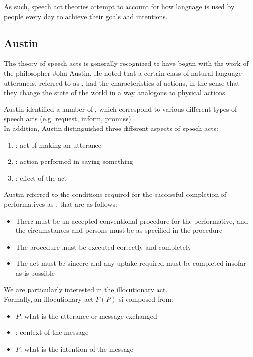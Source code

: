 As such, speech act theories attempt to account for how language is used by people every day to achieve their goals and intentions. 

\subsection{Austin}
The theory of speech acts is generally recognized to have begun with the work of the philosopher John Austin. He noted that a certain class of natural language utterances, referred to as , had the characteristics of actions, in the sense that they change the state of the world in a way analogous to physical actions.

Austin identified a number of , which correspond to various different types of speech acts (e.g. request, inform, promise).\\
In addition, Austin distinguished three different aspects of speech acts:
\begin{enumerate}
\item {}: act of making an utterance
\item {}: action performed in saying something
\item {}: effect of the act
\end{enumerate}
Austin referred to the conditions required for the successful completion of performatives as , that are as follows:
\begin{itemize}
\item There must be an accepted conventional procedure for the performative, and the circumstances and persons must be as specified in the procedure
\item The procedure must be executed correctly and completely
\item The act must be sincere and any uptake required must be completed insofar as is possible
\end{itemize}

We are particularly interested in the illocutionary act.\\ Formally, an illocutionary act $F(P)$ si composed from:
\begin{itemize}
\item {} $P$: what is the utterance or message exchanged
\item {}: context of the message
\item {} $F$: what is the intention of the message
\end{itemize}


